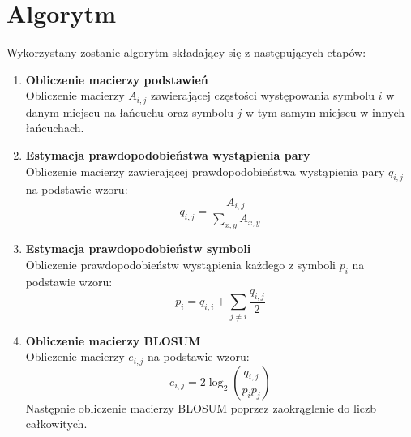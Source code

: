 \documentclass[a4paper,12pt]{article}
\begin{document}
\section{Algorytm}
Wykorzystany zostanie algorytm składający się z następujących etapów:
\begin{enumerate}
\item \textbf{Obliczenie macierzy podstawień}\\
Obliczenie macierzy $A_{i,j}$ zawierającej częstości występowania symbolu $i$ w danym miejscu na łańcuchu oraz symbolu $j$ w tym samym miejscu w innych łańcuchach.
\item \textbf{Estymacja prawdopodobieństwa wystąpienia pary}\\
Obliczenie macierzy zawierającej prawdopodobieństwa wystąpienia pary $q_{i,j}$
na podstawie wzoru:
$$q_{i,j} = \frac{A_{i,j}}{\sum_{x, y}A_{x,y}}$$
\item \textbf{Estymacja prawdopodobieństw symboli}\\
Obliczenie prawdopodobieństw wystąpienia każdego z symboli $p_i$ na podstawie wzoru:
$$p_i = q_{i,i} + \sum_{j \neq i}\frac{q_{i,j}}{2}$$
\item \textbf{Obliczenie macierzy BLOSUM}\\
Obliczenie macierzy $e_{i,j}$ na podstawie wzoru:
$$e_{i,j} = 2\log_2\left(\frac{q_{i,j}}{p_i p_j}\right)$$
Następnie obliczenie macierzy BLOSUM poprzez zaokrąglenie do liczb całkowitych.
\end{enumerate}
\end{document}
